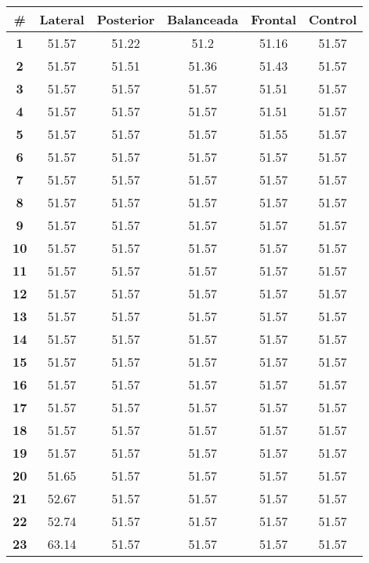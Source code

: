 \begin{longtable}{|c|c|c|c|c|c|}
    \hline
    \rowcolor[HTML]{ECF4FF} 
    \textbf{\#} & \textbf{Lateral} & \textbf{Posterior} & \textbf{Balanceada} & \textbf{Frontal} & \textbf{Control} \\ \hline
    \endhead
    \textbf{1} & 51.57 & 51.22 & 51.2 & 51.16 & 51.57 \\ \hline 
\textbf{2} & 51.57 & 51.51 & 51.36 & 51.43 & 51.57 \\ \hline 
\textbf{3} & 51.57 & 51.57 & 51.57 & 51.51 & 51.57 \\ \hline 
\textbf{4} & 51.57 & 51.57 & 51.57 & 51.51 & 51.57 \\ \hline 
\textbf{5} & 51.57 & 51.57 & 51.57 & 51.55 & 51.57 \\ \hline 
\textbf{6} & 51.57 & 51.57 & 51.57 & 51.57 & 51.57 \\ \hline 
\textbf{7} & 51.57 & 51.57 & 51.57 & 51.57 & 51.57 \\ \hline 
\textbf{8} & 51.57 & 51.57 & 51.57 & 51.57 & 51.57 \\ \hline 
\textbf{9} & 51.57 & 51.57 & 51.57 & 51.57 & 51.57 \\ \hline 
\textbf{10} & 51.57 & 51.57 & 51.57 & 51.57 & 51.57 \\ \hline 
\textbf{11} & 51.57 & 51.57 & 51.57 & 51.57 & 51.57 \\ \hline 
\textbf{12} & 51.57 & 51.57 & 51.57 & 51.57 & 51.57 \\ \hline 
\textbf{13} & 51.57 & 51.57 & 51.57 & 51.57 & 51.57 \\ \hline 
\textbf{14} & 51.57 & 51.57 & 51.57 & 51.57 & 51.57 \\ \hline 
\textbf{15} & 51.57 & 51.57 & 51.57 & 51.57 & 51.57 \\ \hline 
\textbf{16} & 51.57 & 51.57 & 51.57 & 51.57 & 51.57 \\ \hline 
\textbf{17} & 51.57 & 51.57 & 51.57 & 51.57 & 51.57 \\ \hline 
\textbf{18} & 51.57 & 51.57 & 51.57 & 51.57 & 51.57 \\ \hline 
\textbf{19} & 51.57 & 51.57 & 51.57 & 51.57 & 51.57 \\ \hline 
\textbf{20} & 51.65 & 51.57 & 51.57 & 51.57 & 51.57 \\ \hline 
\textbf{21} & 52.67 & 51.57 & 51.57 & 51.57 & 51.57 \\ \hline 
\textbf{22} & 52.74 & 51.57 & 51.57 & 51.57 & 51.57 \\ \hline 
\textbf{23} & 63.14 & 51.57 & 51.57 & 51.57 & 51.57 \\ \hline 

\end{longtable}
